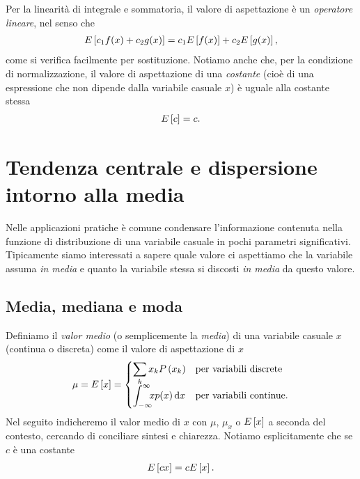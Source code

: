Per la linearità di integrale e sommatoria, il valore di aspettazione è un
\emph{operatore lineare}, nel senso che
\begin{align}
  \displaystyle E\left[c_1 f(x) + c_2 g(x)\right] = c_1 \displaystyle E\left[f(x)\right] + c_2 \displaystyle E\left[g(x)\right],
\end{align}
come si verifica facilmente per sostituzione. Notiamo anche che, per la
condizione di normalizzazione, il valore di aspettazione di una \emph{costante}
(cioè di una espressione che non dipende dalla variabile casuale $x$)
è uguale alla costante stessa
\begin{align}
  \displaystyle E\left[c\right] = c.
\end{align}


\section{Tendenza centrale e dispersione intorno alla media}

Nelle applicazioni pratiche è comune condensare l'informazione
contenuta nella funzione di distribuzione di una variabile casuale in pochi
parametri significativi. Tipicamente siamo interessati a sapere quale valore
ci aspettiamo che la variabile assuma \emph{in media} e quanto la variabile
stessa si discosti \emph{in media} da questo valore.


\subsection{Media, mediana e moda}

Definiamo il \emph{valor medio} (o semplicemente la \emph{media}) di una
variabile casuale $x$ (continua o discreta) come il valore di aspettazione
di $x$
\begin{align}\label{eq:mean}
  \dccases[.]{\mu = \expect{x}}%
          {\sum_k x_k\prob{x_k}}%
          {\intinf xp(x)\diff}
\end{align}
Nel seguito indicheremo il valor medio di $x$ con $\mu$, $\mu_x$ o
$\displaystyle E\left[x\right]$ a seconda del contesto, cercando di conciliare sintesi e
chiarezza. Notiamo esplicitamente che se $c$ è una costante
\begin{align}
  \displaystyle E\left[cx\right] = c\displaystyle E\left[x\right].
\end{align}

